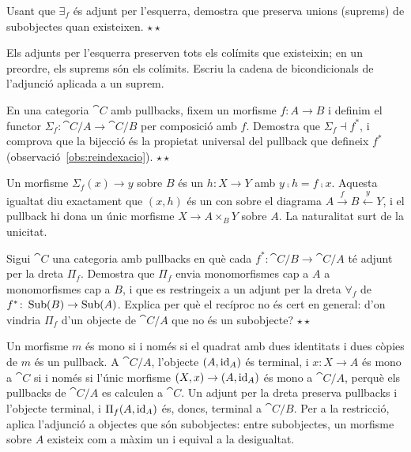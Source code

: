 \begin{exercici}
Usant que $\exists_f$ és adjunt per l'esquerra, demostra que preserva unions (suprems) de subobjectes quan existeixen. \hfill{\normalfont$\star\star$}
\begin{indicacio}
Els adjunts per l'esquerra preserven tots els colímits que existeixin; en un preordre, els suprems són els colímits. Escriu la cadena de bicondicionals de l'adjunció aplicada a un suprem.
\end{indicacio}
\end{exercici}

\begin{exercici}
En una categoria $\cat{C}$ amb pullbacks, fixem un morfisme $f\colon A\to B$ i definim el functor $\Sigma_f\colon\cat{C}/A\to\cat{C}/B$ per composició amb $f$. Demostra que $\Sigma_f\dashv f^{*}$, i comprova que la bijecció és la propietat universal del pullback que defineix $f^{*}$ (observació~\ref{obs:reindexacio}). \hfill{\normalfont$\star\star$}
\begin{indicacio}
Un morfisme $\Sigma_f(x)\to y$ sobre $B$ és un $h\colon X\to Y$ amb $y\comp h=f\comp x$. Aquesta igualtat diu exactament que $(x,h)$ és un con sobre el diagrama $A\xrightarrow{f}B\xleftarrow{y}Y$, i el pullback hi dona un únic morfisme $X\to A\times_B Y$ sobre $A$. La naturalitat surt de la unicitat.
\end{indicacio}
\end{exercici}

\begin{exercici}
Sigui $\cat{C}$ una categoria amb pullbacks en què cada $f^{*}\colon\cat{C}/B\to\cat{C}/A$ té adjunt per la dreta $\Pi_f$. Demostra que $\Pi_f$ envia monomorfismes cap a $A$ a monomorfismes cap a $B$, i que es restringeix a un adjunt per la dreta $\forall_f$ de $f^{*}\colon\operatorname{Sub}(B)\to\operatorname{Sub}(A)$. Explica per què el recíproc no és cert en general: d'on vindria $\Pi_f$ d'un objecte de $\cat{C}/A$ que no és un subobjecte? \hfill{\normalfont$\star\star$}
\begin{indicacio}
Un morfisme $m$ és mono si i només si el quadrat amb dues identitats i dues còpies de $m$ és un pullback. A $\cat{C}/A$, l'objecte $(A,\operatorname{id}_A)$ és terminal, i $x\colon X\to A$ és mono a $\cat{C}$ si i només si l'únic morfisme $(X,x)\to(A,\operatorname{id}_A)$ és mono a $\cat{C}/A$, perquè els pullbacks de $\cat{C}/A$ es calculen a $\cat{C}$. Un adjunt per la dreta preserva pullbacks i l'objecte terminal, i $\Pi_f(A,\operatorname{id}_A)$ és, doncs, terminal a $\cat{C}/B$. Per a la restricció, aplica l'adjunció a objectes que són subobjectes: entre subobjectes, un morfisme sobre $A$ existeix com a màxim un i equival a la desigualtat.
\end{indicacio}
\end{exercici}

